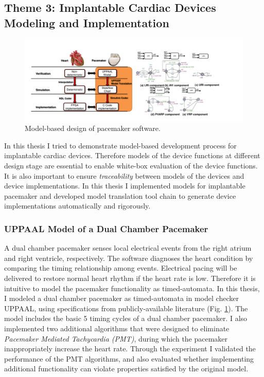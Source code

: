 \documentclass[a4paper]{article}
\begin{document}
\newpage

\subsection{Theme 3: Implantable Cardiac Devices Modeling and Implementation}
\begin{figure}[t]
	\centering
	\includegraphics[scale=0.32]{figs/mb_device.pdf}
	\caption{\small Model-based design of pacemaker software.}
	\label{fig:mb_device}
\end{figure}
In this thesis I tried to demonstrate model-based development process for implantable cardiac devices.
Therefore models of the device functions at different design stage are essential to enable white-box evaluation of the device functions.
It is also important to ensure \emph{traceability} between models of the devices and device implementations.
In this thesis I implemented models for implantable pacemaker and developed model translation tool chain to generate device implementations automatically and rigorously.
\subsubsection{UPPAAL Model of a Dual Chamber Pacemaker}
A dual chamber pacemaker senses local electrical events from the right atrium and right ventricle, respectively.
The software diagnoses the heart condition by comparing the timing relationship among events.
Electrical pacing will be delivered to restore normal heart rhythm if the heart rate is low.
Therefore it is intuitive to model the pacemaker functionality as timed-automata.
In this thesis, I modeled a dual chamber pacemaker as timed-automata in model checker UPPAAL, using specifications from publicly-available literature (Fig. \ref{fig:mb_device}).
The model includes the basic 5 timing cycles of a dual chamber pacemaker.
I also implemented two additional algorithms that were designed to eliminate \emph{Pacemaker Mediated Tachycardia (PMT)}, during which the pacemaker inappropriately increase the heart rate.
Through the experiment I validated the performance of the PMT algorithms, and also evaluated whether implementing additional functionality can violate properties satisfied by the original model.
\end{document}

